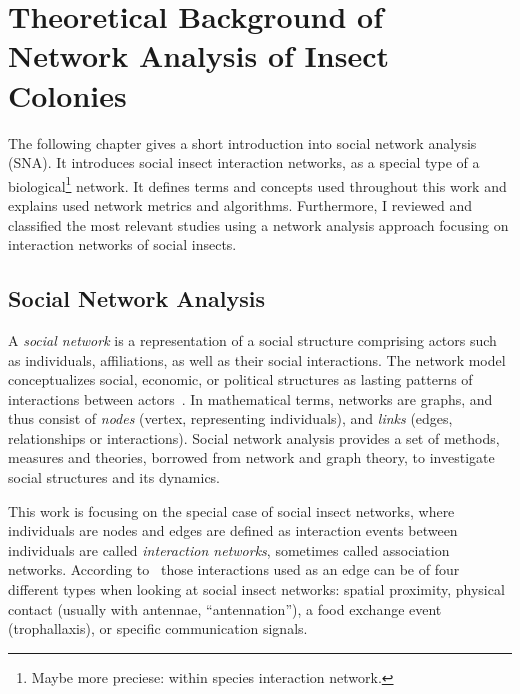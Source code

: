 \chapter{Theoretical Background of Network Analysis of Insect Colonies}
The following chapter gives a short introduction into social network analysis (SNA). It introduces social insect interaction networks, as a special type of a biological\footnote{Maybe more preciese: within species interaction network.} network. It defines terms and concepts used throughout this work and explains used network metrics and algorithms.
Furthermore, I reviewed and classified the most relevant studies using a network analysis approach focusing on interaction networks of social insects.
\section{Social Network Analysis}
\label{ch:bg}

A \emph{social network} is a representation of a social structure comprising actors such as individuals, affiliations, as well as their social interactions.
The network model conceptualizes social, economic, or political structures as lasting patterns of interactions between actors~\cite{wasserman1994social}.
In mathematical terms, networks are graphs, and thus consist of \emph{nodes} (vertex, representing individuals), and \emph{links} (edges, relationships or interactions).
Social network analysis provides a set of methods, measures and theories, borrowed from network and graph theory, to investigate social structures and its dynamics.

This work is focusing on the special case of social insect networks, where individuals are nodes and edges are defined as interaction events between individuals are called \emph{interaction networks}, sometimes called association networks.
According to~\textcite{charbonneau2013social} those interactions used as an edge can be of four different types when looking at social insect networks: spatial proximity, physical contact (usually with antennae, “antennation”), a food exchange event (trophallaxis), or specific communication signals.

